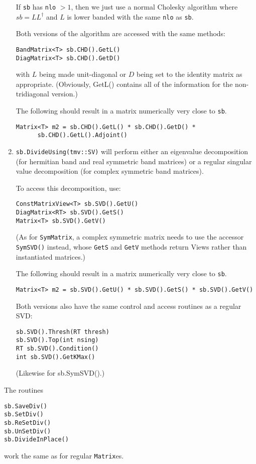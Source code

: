 \documentclass[twoside,letterpaper,11pt]{article}
\renewcommand{\tt}[1]{{\texttt {#1}}}
\begin{document}
\begin{enumerate}
If \tt{sb} has \tt{nlo} $> 1$, then we just use a normal Cholesky algorithm
where $sb = LL^\dagger$ and $L$ is lower banded with the same \tt{nlo} as
\tt{sb}.

Both versions of the algorithm are accessed with the same methods:
\begin{verbatim}
BandMatrix<T> sb.CHD().GetL()
DiagMatrix<T> sb.CHD().GetD()
\end{verbatim}
with $L$ being made unit-diagonal or $D$ being set to the identity matrix
as appropriate.  (Obviously, GetL() contains all of the information for the non-tridiagonal
version.)

The following should result in a matrix numerically very close to \tt{sb}.
\begin{verbatim}
Matrix<T> m2 = sb.CHD().GetL() * sb.CHD().GetD() * 
      sb.CHD().GetL().Adjoint()
\end{verbatim}

\item
\tt{sb.DivideUsing(tmv::SV)} will perform either an eigenvalue decomposition
(for hermitian band and real symmetric band matrices) or a regular singular value
decomposition (for complex symmetric band matrices).

To access this decomposition, use:
\begin{verbatim}
ConstMatrixView<T> sb.SVD().GetU()
DiagMatrix<RT> sb.SVD().GetS()
Matrix<T> sb.SVD().GetV()
\end{verbatim}
(As for \tt{SymMatrix}, a complex symmetric matrix needs to use the accessor
\tt{SymSVD()} instead, whose \tt{GetS} and \tt{GetV} methods return Views
rather than instantiated matrices.)

The following should result in a matrix numerically very close to \tt{sb}.
\begin{verbatim}
Matrix<T> m2 = sb.SVD().GetU() * sb.SVD().GetS() * sb.SVD().GetV()
\end{verbatim}

Both versions also have the same control and access routines as a regular SVD:
\begin{verbatim}
sb.SVD().Thresh(RT thresh)
sb.SVD().Top(int nsing)
RT sb.SVD().Condition()
int sb.SVD().GetKMax()
\end{verbatim}
(Likewise for sb.SymSVD().)

\end{enumerate}
The routines 
\begin{verbatim}
sb.SaveDiv()
sb.SetDiv()
sb.ReSetDiv()
sb.UnSetDiv()
sb.DivideInPlace()
\end{verbatim}
work the same as for regular \tt{Matrix}es.
\end{document}
